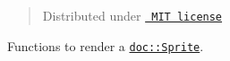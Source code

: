 \begin{quote}
Distributed under \href{LICENSE.txt}{\texttt{ MIT license}} \end{quote}
Functions to render a \href{../doc/sprite.h}{\texttt{ {\ttfamily doc\+::\+Sprite}}}. 